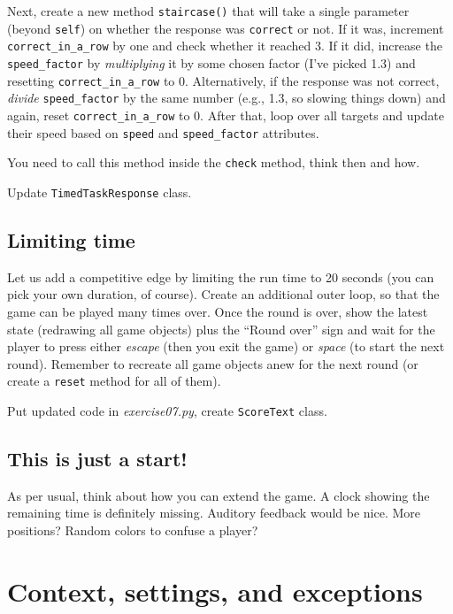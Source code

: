 \documentclass[
]{book}
\begin{document}
Next, create a new method \texttt{staircase()} that will take a single parameter (beyond \texttt{self}) on whether the response was \texttt{correct} or not. If it was, increment \texttt{correct\_in\_a\_row} by one and check whether it reached 3. If it did, increase the \texttt{speed\_factor} by \emph{multiplying} it by some chosen factor (I've picked 1.3) and resetting \texttt{correct\_in\_a\_row} to 0. Alternatively, if the response was not correct, \emph{divide} \texttt{speed\_factor} by the same number (e.g., 1.3, so slowing things down) and again, reset \texttt{correct\_in\_a\_row} to 0. After that, loop over all targets and update their speed based on \texttt{speed} and \texttt{speed\_factor} attributes.

You need to call this method inside the \texttt{check} method, think then and how.

Update \texttt{TimedTaskResponse} class.

\hypertarget{limiting-time}{%
\section{Limiting time}\label{limiting-time}}

Let us add a competitive edge by limiting the run time to 20 seconds (you can pick your own duration, of course). Create an additional outer loop, so that the game can be played many times over. Once the round is over, show the latest state (redrawing all game objects) plus the ``Round over'' sign and wait for the player to press either \emph{escape} (then you exit the game) or \emph{space} (to start the next round). Remember to recreate all game objects anew for the next round (or create a \texttt{reset} method for all of them).

Put updated code in \emph{exercise07.py}, create \texttt{ScoreText} class.

\hypertarget{this-is-just-a-start}{%
\section{This is just a start!}\label{this-is-just-a-start}}

As per usual, think about how you can extend the game. A clock showing the remaining time is definitely missing. Auditory feedback would be nice. More positions? Random colors to confuse a player?

\hypertarget{seminar-02-07}{%
\chapter{Context, settings, and exceptions}\label{seminar-02-07}}
\end{document}
